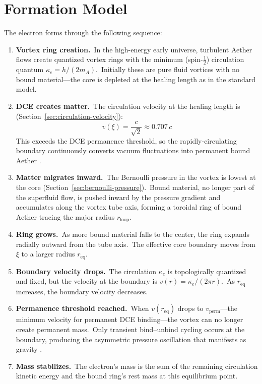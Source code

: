 \documentclass[12pt,letterpaper]{article}
\newcommand{\rloop}{r_{\mathrm{loop}}}
\begin{document}
\section{Formation Model}
\label{sec:formation}

The electron forms through the following sequence:

\begin{enumerate}
  \item \textbf{Vortex ring creation.}\ In the high-energy early universe,
    turbulent Aether flows create quantized vortex rings with the minimum
    (spin-$\tfrac{1}{2}$) circulation quantum
    $\kappa_e = h/(2m_A)$.\ Initially these are pure fluid vortices with no
    bound material---the core is depleted at the healing length as in the
    standard model.

  \item \textbf{DCE creates matter.}\ The circulation velocity at the
    healing length is (Section~\ref{sec:circulation-velocity}):
    \begin{equation}
      v(\xi) = \frac{c}{\sqrt{2}} \approx 0.707\,c
      \label{eq:v-at-xi}
    \end{equation}
    This exceeds the DCE permanence threshold, so the rapidly-circulating
    boundary continuously converts vacuum fluctuations into permanent bound
    Aether \cite{wilson2011}.

  \item \textbf{Matter migrates inward.}\ The Bernoulli pressure in the
    vortex is lowest at the core
    (Section~\ref{sec:bernoulli-pressure}).\ Bound material, no longer part
    of the superfluid flow, is pushed inward by the pressure gradient and
    accumulates along the vortex tube axis, forming a toroidal ring of bound
    Aether tracing the major radius $\rloop$.

  \item \textbf{Ring grows.}\ As more bound material falls to the center,
    the ring expands radially outward from the tube axis.\ The effective core
    boundary moves from $\xi$ to a larger radius $r_{\mathrm{eq}}$.

  \item \textbf{Boundary velocity drops.}\ The circulation $\kappa_e$ is
    topologically quantized and fixed, but the velocity at the boundary is
    $v(r) = \kappa_e/(2\pi r)$.\ As $r_{\mathrm{eq}}$ increases, the
    boundary velocity decreases.

  \item \textbf{Permanence threshold reached.}\ When
    $v(r_{\mathrm{eq}})$ drops to $v_{\mathrm{perm}}$---the minimum velocity
    for permanent DCE binding---the vortex can no longer create permanent
    mass.\ Only transient bind--unbind cycling occurs at the boundary,
    producing the asymmetric pressure oscillation that manifests as gravity
    \cite{otto-gravity}.

  \item \textbf{Mass stabilizes.}\ The electron's mass is the sum of the
    remaining circulation kinetic energy and the bound ring's rest mass at
    this equilibrium point.
\end{enumerate}
\end{document}
